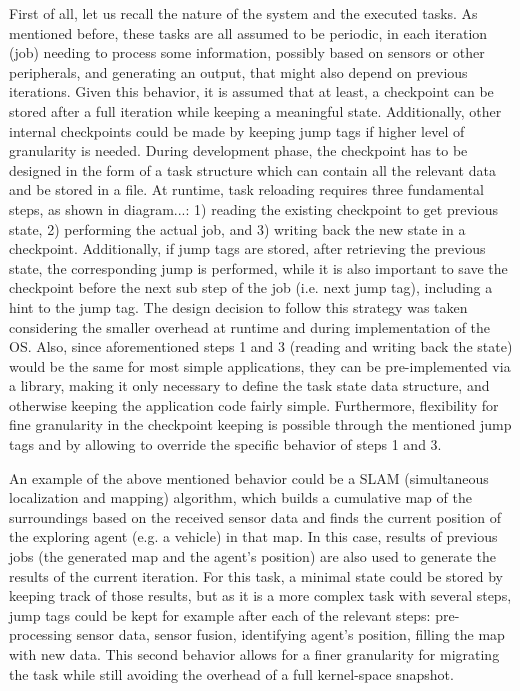 First of all, let us recall the nature of the system and the executed tasks. As mentioned before, these tasks are all assumed to be periodic, in each iteration (job) needing to process some information, possibly based on sensors or other peripherals, and generating an output, that might also depend on previous iterations. Given this behavior, it is assumed that at least, a checkpoint can be stored after a full iteration while keeping a meaningful state. Additionally, other internal checkpoints could be made by keeping jump tags if higher level of granularity is needed. During development phase, the checkpoint has to be designed in the form of a task structure which can contain all the relevant data and be stored in a file. At runtime, task reloading requires three fundamental steps, as shown in diagram...: 1) reading the existing checkpoint to get previous state, 2) performing the actual job, and 3) writing back the new state in a checkpoint. Additionally, if jump tags are stored, after retrieving the previous state, the corresponding jump is performed, while it is also important to save the checkpoint before the next sub step of the job (i.e. next jump tag), including a hint to the jump tag. The design decision to follow this strategy was taken considering the smaller overhead at runtime and during implementation of the OS. Also, since aforementioned steps 1 and 3 (reading and writing back the state) would be the same for most simple applications, they can be pre-implemented via a library, making it only necessary to define the task state data structure, and otherwise keeping the application code fairly simple. Furthermore, flexibility for fine granularity in the checkpoint keeping is possible through the mentioned jump tags and by allowing to override the specific behavior of steps 1 and 3.

An example of the above mentioned behavior could be a SLAM (simultaneous localization and mapping) algorithm, which builds a cumulative map of the surroundings based on the received sensor data and finds the current position of the exploring agent (e.g. a vehicle) in that map. In this case, results of previous jobs (the generated map and the agent's position) are also used to generate the results of the current iteration. For this task, a minimal state could be stored by keeping track of those results, but as it is a more complex task with several steps, jump tags could be kept for example after each of the relevant steps: pre-processing sensor data, sensor fusion, identifying agent's position, filling the map with new data. This second behavior allows for a finer granularity for migrating the task while still avoiding the overhead of a full kernel-space snapshot.

